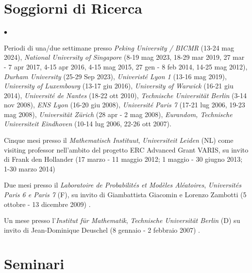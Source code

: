 \documentclass[a4paper,11pt,oneside]{amsart}
\newenvironment{myitemize}{%
\begin{list}{$\bullet$}%
 	{%
	\setlength{\itemsep}{0.3em}%
	\setlength{\topsep}{0.3em}%
	\setlength{\partopsep}{0em}%
	\setlength{\parsep}{0em}%
	\setlength{\parskip}{0em}%
	\setlength\leftmargin{1.5em}%
	\setlength\labelwidth{1.1em}%
	\setlength{\labelsep}{0.4em}%
	}%
	}%
{\end{list}}
\renewenvironment{itemize}{
\begin{myitemize}}%
{\end{myitemize}}
\begin{document}
\newpage

\section{Soggiorni di Ricerca}

\begin{itemize}
\item Periodi di una/due settimane presso
\emph{Peking University / BICMR} (13-24 mag 2024),
\emph{National University of Singapore} 
(8-19 mag 2023, 18-29 mar 2019, 27 mar - 7 apr 2017, 
4-15 apr 2016, 4-15 mag 2015, 27 gen - 8 feb 2014, 14-25 mag 2012),
\emph{Durham University} (25-29 Sep 2023),
\emph{Univeristé Lyon 1} (13-16 mag 2019),
\emph{University of Luxembourg} (13-17 giu 2016),
\emph{University of Warwick} (16-21 giu 2014),
\emph{Université de Nantes} (18-22 ott 2010),
\emph{Technische Universit\"at Berlin} (3-14 nov 2008), \emph{ENS Lyon} (16-20 giu 2008),
\textit{Université Paris 7} (17-21 lug 2006, 19-23 mag 2008),
\textit{Universit\"at Z\"urich} (28 apr - 2 mag 2008),
\emph{Eurandom, Technische Universiteit Eindhoven} (10-14 lug 2006, 22-26 ott 2007).

\item Cinque mesi presso il \emph{Mathematisch Instituut}, \emph{Universiteit Leiden} (NL)
come visiting professor nell'ambito del progetto
ERC Advanced Grant VARIS, su invito di Frank den Hollander
(17 marzo - 11 maggio 2012; 1 maggio - 30 giugno 2013; 1-30 marzo 2014) 

\item Due mesi presso il 
\textit{Laboratoire de Probabilités et Modèles Aléatoires},
\textit{Universités Paris 6 e Paris 7} (F), su invito di Giambattista Giacomin
e Lorenzo Zambotti  (5 ottobre - 13 dicembre 2009) .

\item Un mese presso l'\emph{Institut f\"ur Mathematik}, \emph{Technische Universit\"at Berlin} (D)
su invito di Jean-Dominique Deuschel (8 gennaio - 2 febbraio 2007) .
\end{itemize}









\section{Seminari}
\label{sec:seminari}

\end{document}
